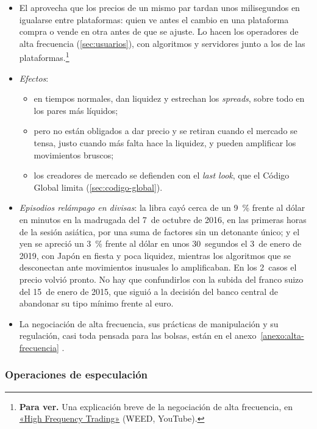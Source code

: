 \documentclass[11pt]{article}
\begin{document}
\begin{itemize}
\item El  aprovecha que los precios de un mismo par tardan unos milisegundos en igualarse entre plataformas: quien ve antes el cambio en una plataforma compra o vende en otra antes de que se ajuste. Lo hacen los operadores de alta frecuencia (\ref{sec:usuarios}), con algoritmos y servidores junto a los de las plataformas.\footnote{\textbf{Para ver.} Una explicación breve de la negociación de alta frecuencia, en \href{https://www.youtube.com/watch?v=z4nCTdQlH8w}{«High Frequency Trading»} (WEED, YouTube).}
\item \emph{Efectos}:
  \begin{itemize}
  \item en tiempos normales, dan liquidez y estrechan los \emph{spreads}, sobre todo en los pares más líquidos\nocite{BIS2011HFT};
  \item pero no están obligados a dar precio y se retiran cuando el mercado se tensa, justo cuando más falta hace la liquidez, y pueden amplificar los movimientos bruscos\nocite{BIS2020Algos};
  \item los creadores de mercado se defienden con el \emph{last look}, que el Código Global limita (\ref{sec:codigo-global}).
  \end{itemize}
\item \emph{Episodios relámpago en divisas}: la libra cayó cerca de un 9~\% frente al dólar en minutos en la madrugada del 7~de octubre de 2016, en las primeras horas de la sesión asiática, por una suma de factores sin un detonante único\nocite{BIS2017Sterling}; y el yen se apreció un 3~\% frente al dólar en unos 30~segundos el 3~de enero de 2019, con Japón en fiesta y poca liquidez, mientras los algoritmos que se desconectan ante movimientos inusuales lo amplificaban\nocite{RBA2019Yen}. En los 2~casos el precio volvió pronto. No hay que confundirlos con la subida del franco suizo del 15~de enero de 2015, que siguió a la decisión del banco central de abandonar su tipo mínimo frente al euro\nocite{SNB2015Minimo}.
\item La negociación de alta frecuencia, sus prácticas de manipulación y su regulación, casi toda pensada para las bolsas, están en el anexo~\ref{anexo:alta-frecuencia} .
\end{itemize}

\subsubsection{Operaciones de especulación}\label{sec:op-especulacion}
\end{document}
